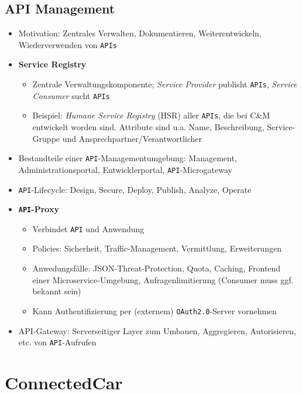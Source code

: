 \subsection{API Management}
\begin{itemize}
	\item Motivation: Zentrales Verwalten, Dokumentieren, Weiterentwickeln, Wiederverwenden von \texttt{APIs}
	\item \textbf{Service Registry}
	\begin{itemize}
		\item Zentrale Verwaltungskomponente; \textit{Service Provider} publisht \texttt{APIs}, \textit{Service Consumer} sucht \texttt{APIs}
		\item Beispiel: \textit{Humane Service Registry} (HSR) aller \texttt{APIs}, die bei C\&M entwickelt worden sind. Attribute sind u.a. Name, Beschreibung, Service-Gruppe und Ansprechpartner/Verantwortlicher
	\end{itemize}
	\item Bestandteile einer \texttt{API}-Managementumgebung: Management, Administrationsportal, Entwicklerportal, \texttt{API}-Microgateway
	\item \texttt{API}-Lifecycle: Design, Secure, Deploy, Publish, Analyze, Operate
	\item \textbf{\texttt{API}-Proxy}
	\begin{itemize}
		\item Verbindet \texttt{API} und Anwendung
		\item Policies: Sicherheit, Traffic-Management, Vermittlung, Erweiterungen
		\item Anwedungsfälle: JSON-Threat-Protection, Quota, Caching, Frontend einer Microservice-Umgebung, Anfragenlimitierung (Consumer muss ggf. bekannt sein)
		\item Kann Authentifizierung per (externem) \texttt{OAuth2.0}-Server vornehmen
	\end{itemize}
	\item {API}-Gateway: Serverseitiger Layer zum Umbauen, Aggregieren, Autorisieren, etc. von \texttt{API}-Aufrufen
\end{itemize}



\section{ConnectedCar}

